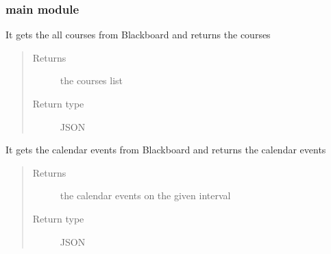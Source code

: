 \documentclass[letterpaper,10pt,english]{sphinxmanual}
\begin{document}
\sphinxstepscope


\subsubsection{main module}
\label{\detokenize{main:module-main}}\label{\detokenize{main:main-module}}\label{\detokenize{main::doc}}

\begin{fulllineitems}
\label{\detokenize{main:main.getAllCourses}}
\pysigstartsignatures
{}
\pysigstopsignatures
\sphinxAtStartPar
It gets the all courses from Blackboard and returns the courses
\begin{quote}\begin{description}
\item[{Returns}] \leavevmode
\sphinxAtStartPar
the courses list

\item[{Return type}] \leavevmode
\sphinxAtStartPar
JSON

\end{description}\end{quote}

\end{fulllineitems}


\begin{fulllineitems}
\label{\detokenize{main:main.getCalendarEvent}}
\pysigstartsignatures
{}
\pysigstopsignatures
\sphinxAtStartPar
It gets the calendar events from Blackboard and returns the calendar events
\begin{quote}\begin{description}
\item[{Returns}] \leavevmode
\sphinxAtStartPar
the calendar events on the given interval

\item[{Return type}] \leavevmode
\sphinxAtStartPar
JSON

\end{description}\end{quote}

\end{fulllineitems}
\end{document}
